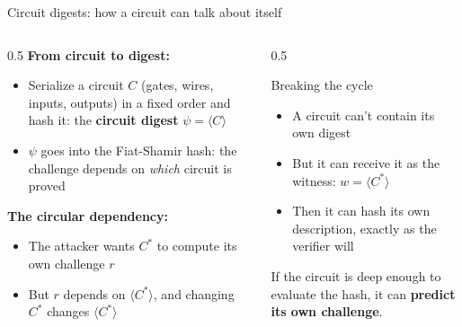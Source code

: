 \ifdefined\PRESENTATION\else\PassOptionsToClass{handout}{beamer}\fi\documentclass[aspectratio=169, lualatex]{beamer}
\begin{document}
\begin{frame}{Circuit digests: how a circuit can talk about itself}
	\begin{columns}[c]
		\begin{column}{0.5\textwidth}
			\textbf{From circuit to digest:}
			\begin{itemize}
				\item Serialize a circuit $C$ (gates, wires, inputs, outputs) in a fixed order and hash it: the \textbf{circuit digest} $\psi = \langle C \rangle$
				\item $\psi$ goes into the Fiat-Shamir hash: the challenge depends on \textit{which} circuit is proved
			\end{itemize}
			\textbf{The circular dependency:}
			\begin{itemize}
				\item The attacker wants $C^*$ to compute its own challenge $r$
				\item But $r$ depends on $\langle C^* \rangle$, and changing $C^*$ changes $\langle C^* \rangle$
			\end{itemize}
		\end{column}
		\begin{column}{0.5\textwidth}
			\begin{alertblock}{Breaking the cycle}
				\begin{itemize}
					\item A circuit can't contain its own digest
					\item But it can receive it as the witness: $w = \langle C^* \rangle$
					\item Then it can hash its own description, exactly as the verifier will
				\end{itemize}
			\end{alertblock}
			If the circuit is deep enough to evaluate the hash, it can \textbf{predict its own challenge}.
		\end{column}
	\end{columns}
\end{frame}
\end{document}
